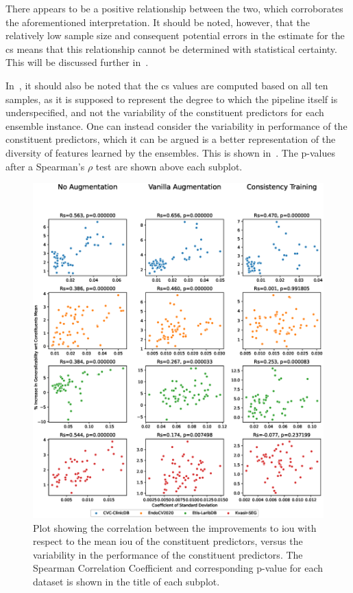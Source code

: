 There appears to be a positive relationship between the two, which corroborates the aforementioned interpretation. It should be noted, however, that the relatively low sample size and consequent potential errors in the estimate for the \gls{cs} means that this relationship cannot be determined with statistical certainty. This will be discussed further in~. 

In~, it should also be noted that the \gls{cs} values are computed based on all ten samples, as it is supposed to represent the degree to which the pipeline itself is underspecified, and not the variability of the constituent predictors for each ensemble instance. One can instead consider the variability in performance of the constituent predictors, which it can be argued is a better representation of the diversity of features learned by the ensembles. This is shown in~. The p-values after a Spearman's \(\rho\) test are shown above each subplot. 

\begin{figure}[!hb]
    \centering
    \hspace*{-1.9cm}\includegraphics[width=1.2\linewidth]{illustrations/ensemble_variance_relationship_statistical.eps}
     \caption[Relationship between ensemble improvements and constituents' performance variability]{Plot showing the correlation between the improvements to \gls{iou} with respect to the mean \gls{iou} of the constituent predictors, versus the variability in the performance of the constituent predictors. The Spearman Correlation Coefficient and corresponding p-value for each dataset is shown in the title of each subplot.}
    \label{fig:ensemble_var_stat}
\end{figure}

